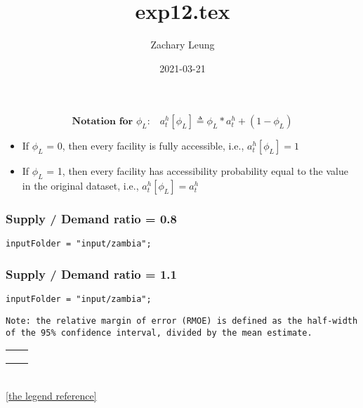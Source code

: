 \documentclass[12pt]{article}
\title{exp12.tex}
\author{Zachary Leung}
\date{2021-03-21}
\begin{document}
\maketitle

\begin{equation*}
\textbf{Notation for $\phi_L$:}
\quad
a_{t}^{h}[\phi_{L}] \triangleq \phi_{L}*a_{t}^{h} + (1-\phi_{L})
\end{equation*}

\begin{center}
\begin{itemize}
\item If $\phi_L$ = 0, then every facility is fully accessible, i.e.,
      $a_t^h[\phi_{L}] = 1$
\item If $\phi_L$ = 1, then every facility has accessibility probability
      equal to the value in the original dataset, i.e.,
      $a_t^h[\phi_{L}] = a_t^h$
\end{itemize}
\end{center}

\subsubsection*{Supply / Demand ratio = 0.8}
\begin{verbatim}
inputFolder = "input/zambia";
\end{verbatim}




\subsubsection*{Supply / Demand ratio = 1.1}
\begin{verbatim}
inputFolder = "input/zambia";
\end{verbatim}


\begin{verbatim}
Note: the relative margin of error (RMOE) is defined as the half-width
of the 95% confidence interval, divided by the mean estimate.
\end{verbatim}








\clearpage
\pgfplotsset{width=10cm,height=10cm}
\begin{center}
\begin{tabular}{MM}
%
&
%
\\[5mm]
%
&
%
\\[5mm]
%
&
%
\end{tabular}
~\\[5mm]
\ref{the legend reference}
\end{center}
\end{document}
